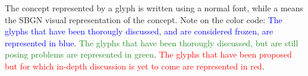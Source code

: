 The concept represented by a glyph is written using a normal font, while a  means the SBGN visual representation of the concept. Note on the color code: \textcolor{blue}{The glyphs that have been thorougly discussed, and are considered frozen, are represented in blue}. \textcolor{ForestGreen}{The glyphs that have been thorougly discussed, but are still posing problems are represented in green}. \textcolor{red}{The glyphs that have been proposed but for which in-depth discussion is yet to come are represented in red}.




